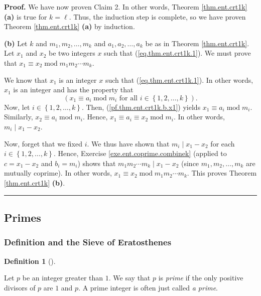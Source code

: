 \documentclass[numbers=enddot,12pt,final,onecolumn,notitlepage]{scrartcl}%
\numberwithin{exer}{subsection}
\theoremstyle{definition}
\newtheorem{defi}[theo]{Definition}
\newenvironment{definition}[1][]
{\begin{defi}[#1]\begin{leftbar}}
{\end{leftbar}\end{defi}}
\newenvironment{proof}[1][Proof]{\noindent\textbf{#1.} }{\ \rule{0.5em}{0.5em}}
\begin{document}
\begin{proof}
We have now proven Claim 2. In other words, Theorem \ref{thm.ent.crt1k}
\textbf{(a)} is true for $k=\ell$. Thus, the induction step is complete, so we
have proven Theorem \ref{thm.ent.crt1k} \textbf{(a)} by induction.

\textbf{(b)} Let $k$ and $m_{1},m_{2},\ldots,m_{k}$ and $a_{1},a_{2}%
,\ldots,a_{k}$ be as in Theorem \ref{thm.ent.crt1k}. Let $x_{1}$ and $x_{2}$
be two integers $x$ such that (\ref{eq.thm.ent.crt1k.1}). We must prove that
$x_{1}\equiv x_{2}\operatorname{mod}m_{1}m_{2}\cdots m_{k}$.

We know that $x_{1}$ is an integer $x$ such that (\ref{eq.thm.ent.crt1k.1}).
In other words, $x_{1}$ is an integer and has the property that%
\begin{equation}
\left(  x_{1}\equiv a_{i}\operatorname{mod}m_{i}\text{ for all }i\in\left\{
1,2,\ldots,k\right\}  \right)  . \label{pf.thm.ent.crt1k.b.x1}%
\end{equation}
Now, let $i\in\left\{  1,2,\ldots,k\right\}  $. Then,
(\ref{pf.thm.ent.crt1k.b.x1}) yields $x_{1}\equiv a_{i}\operatorname{mod}%
m_{i}$. Similarly, $x_{2}\equiv a_{i}\operatorname{mod}m_{i}$. Hence,
$x_{1}\equiv a_{i}\equiv x_{2}\operatorname{mod}m_{i}$. In other words,
$m_{i}\mid x_{1}-x_{2}$.

Now, forget that we fixed $i$. We thus have shown that $m_{i}\mid x_{1}-x_{2}$
for each $i\in\left\{  1,2,\ldots,k\right\}  $. Hence, Exercise
\ref{exe.ent.coprime.combinek} (applied to $c=x_{1}-x_{2}$ and $b_{i}=m_{i}$)
shows that $m_{1}m_{2}\cdots m_{k}\mid x_{1}-x_{2}$ (since $m_{1},m_{2}%
,\ldots,m_{k}$ are mutually coprime). In other words, $x_{1}\equiv
x_{2}\operatorname{mod}m_{1}m_{2}\cdots m_{k}$. This proves Theorem
\ref{thm.ent.crt1k} \textbf{(b)}.
\end{proof}

\subsection{Primes}

\subsubsection{Definition and the Sieve of Eratosthenes}

\begin{definition}
\label{def.ent.prime}Let $p$ be an integer greater than $1$. We say that $p$
is \textit{prime} if the only positive divisors of $p$ are $1$ and $p$. A
prime integer is often just called \textit{a prime}.
\end{definition}
\end{document}
